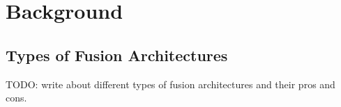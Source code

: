 \documentclass[report.tex]{subfiles}
\begin{document}
    \chapter{Background}

    \section{Types of Fusion Architectures}

    TODO: write about different types of fusion architectures and their pros and cons.

    
\end{document}

